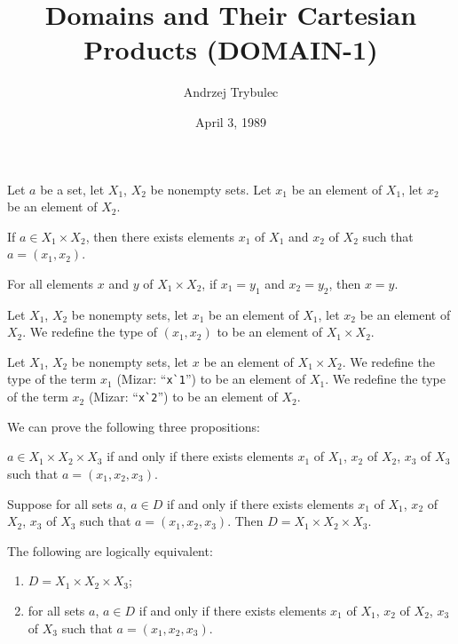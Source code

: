\documentclass{article}
\title{Domains and Their Cartesian Products (DOMAIN-1)}
\author{Andrzej Trybulec}
\date{April 3, 1989}
\begin{document}
\maketitle

Let $a$ be a set, let $X_{1}$, $X_{2}$ be nonempty sets. Let $x_{1}$ be
an element of $X_{1}$, let $x_{2}$ be an element of $X_{2}$.
\begin{thm}
\item\label{domain1:1} If $a\in X_{1}\times X_{2}$, then there exists
  elements $x_{1}$ of $X_{1}$ and $x_{2}$ of $X_{2}$ such that $a=(x_{1},x_{2})$.
\item\label{domain1:2} For all elements $x$ and $y$ of $X_{1}\times X_{2}$,
  if $x_{1}=y_{1}$ and $x_{2}=y_{2}$, then $x=y$.
\end{thm}

\begin{definition}
Let $X_{1}$, $X_{2}$ be nonempty sets, let $x_{1}$ be an element of $X_{1}$,
let $x_{2}$ be an element of $X_{2}$.
We redefine the type of $(x_{1},x_{2})$ to be an element of $X_{1}\times X_{2}$.
\end{definition}

\begin{definition}
Let $X_{1}$, $X_{2}$ be nonempty sets, let $x$ be an element of
$X_{1}\times X_{2}$.
We redefine the type of the term $x_{1}$ (Mizar: ``\verb#x`1#'') to be
an element of $X_{1}$.
We redefine the type of the term $x_{2}$ (Mizar: ``\verb#x`2#'') to be
an element of $X_{2}$.
\end{definition}

We can prove the following three propositions:
\begin{thm}
\item\label{domain1:3} $a\in X_{1}\times X_{2}\times X_{3}$ if and only
  if there exists elements $x_{1}$ of $X_{1}$, $x_{2}$ of $X_{2}$,
  $x_{3}$ of $X_{3}$ such that $a=(x_{1},x_{2},x_{3})$.
\item\label{domain1:4} Suppose for all sets $a$, $a\in D$ if and only if
  there exists elements $x_{1}$ of $X_{1}$, $x_{2}$ of $X_{2}$,
  $x_{3}$ of $X_{3}$ such that $a=(x_{1},x_{2},x_{3})$.
  Then $D=X_{1}\times X_{2}\times X_{3}$.
\item\label{domain1:5} The following are logically equivalent:
  \begin{enumerate}[label=(\roman*)]
  \item $D=X_{1}\times X_{2}\times X_{3}$;
  \item for all sets $a$, $a\in D$ if and only if there exists elements $x_{1}$ of $X_{1}$, $x_{2}$ of $X_{2}$,
  $x_{3}$ of $X_{3}$ such that $a=(x_{1},x_{2},x_{3})$.
  \end{enumerate}
\end{thm}
\end{document}
